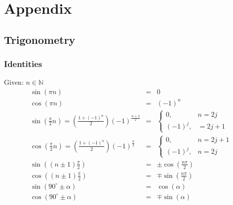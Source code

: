 \section{Appendix}

\createsectiontoc{}

\subsection{Trigonometry}
\subsubsection{Identities}
Given: $n \in \mathbb{N}$
\begin{align*}
     & \sin(\pi n)                                                                      & = & 0                                                       \\
     & \cos(\pi n)                                                                      & = & {(-1)}^n                                                \\
     & \sin(\frac{\pi}{2}n) = \left(\frac{1 + {(-1)}^n}{2}\right){(-1)}^{\frac{n+2}{2}} & = & \begin{cases} 0, &n=2j \\ {(-1)}^j,&=2j+1 \end{cases}   \\
     & \cos(\frac{\pi}{2}n) = \left(\frac{1+{(-1)}^n}{2}\right){(-1)}^{\frac{n}{2}}     & = & \begin{cases} 0, &n=2j+1 \\ {(-1)}^j, &n=2j \end{cases} \\
     & \sin\left(\left(n\pm 1\right)\frac{\pi}{2}\right)                                & = & \pm \cos\left(\frac{n\pi}{2}\right)                     \\
     & \cos\left(\left(n\pm 1\right)\frac{\pi}{2}\right)                                & = & \mp \sin\left(\frac{n\pi}{2}\right)                     \\
     & \sin(90^\circ\pm\alpha)                                                          & = & \cos(\alpha)                                            \\
     & \cos(90^\circ\pm\alpha)                                                          & = & \mp\sin(\alpha)                                         \\

\end{align*}
